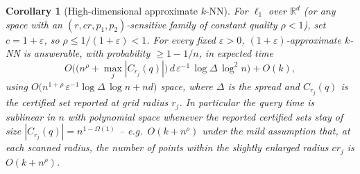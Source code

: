 \documentclass{amsart}
\newtheorem{corollary}{Corollary}
\newcommand{\R}{\mathbb{R}}
\newcommand{\eps}{\varepsilon}
\begin{document}
\begin{corollary}[High-dimensional approximate $k$-NN]\label{cor:knn}
For $\ell_1$ over $\R^d$ (or any space with an $(r,cr,p_1,p_2)$-sensitive family of
constant quality $\rho<1$), set $c=1+\eps$, so $\rho\le 1/(1+\eps)<1$.  For every fixed
$\eps>0$, $(1+\eps)$-approximate $k$-NN is answerable, with probability $\ge 1-1/n$, in
expected time
\[
O\Big(\big(n^{\rho}+\max_j |C_{r_j}(q)|\big)\, d\,\eps^{-1}\,\log\Delta\,\log^2 n\Big)+O(k),
\]
using
$O\big(n^{1+\rho}\,\eps^{-1}\log\Delta\,\log n + nd\big)$ space, where $\Delta$ is the
spread and $C_{r_j}(q)$ is the certified set reported at grid radius $r_j$.  In
particular the query time is \emph{sublinear in $n$ with polynomial space} whenever the
reported certified sets stay of size $|C_{r_j}(q)|=n^{1-\Omega(1)}$ -- e.g.\ $O(k+n^{\rho})$
under the mild assumption that, at each scanned radius, the number of points within the
slightly enlarged radius $cr_j$ is $O(k+n^{\rho})$.
\end{corollary}
\end{document}
